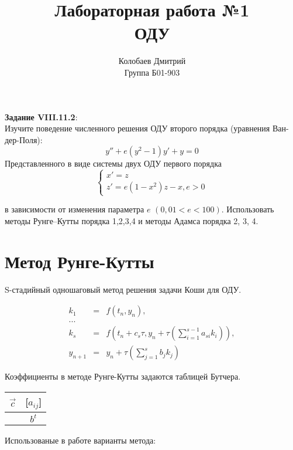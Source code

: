 \documentclass[a4paper,12pt]{article} %
\author{Колобаев Дмитрий\\Группа Б01-903}
\title{Лабораторная работа №1 \\ОДУ} %
\begin{document}
\maketitle

\begin{flushleft}
	\textbf{Задание VIII.11.2}: \\
	Изучите поведение численного решения ОДУ второго порядка (уравнения Ван-дер-Поля):
	$$y'' + e(y^2 - 1)y' + y = 0$$
	Представленного в виде системы двух ОДУ первого порядка
	$$
	\begin{cases}
		x' = z \\
		z' = e(1 - x^2)z - x, e>0
	\end{cases}
	$$

	в зависимости от изменения параметра $e$ $(0,01 < e < 100)$. Использовать методы Рунге–Кутты порядка 1,2,3,4 и методы Адамса порядка 2, 3, 4.
\end{flushleft}

\section*{Метод Рунге-Кутты}

S-стадийный одношаговый метод решения задачи Коши для ОДУ.

\begin{eqnarray*}
	k_1 & = & f(t_n, y_n),\\
	... && \\
	k_s & = & f(t_n + c_s\tau, y_n + \tau(\sum_{i=1}^{s-1}a_{si}k_i) ),\\
	y_{n+1} & = & y_n + \tau(\sum_{j=1}^sb_jk_j)
\end{eqnarray*}

Коэффициенты в методе Рунге-Кутты задаются таблицей Бутчера.

\begin{tabular}[H]{|c|c|}
	\hline
	$\vec{c}$ & [$a_{ij}$] \\ \hline
	& $b^t$ \\
	\hline
\end{tabular}

Использованые в работе варианты метода:
\end{document}
